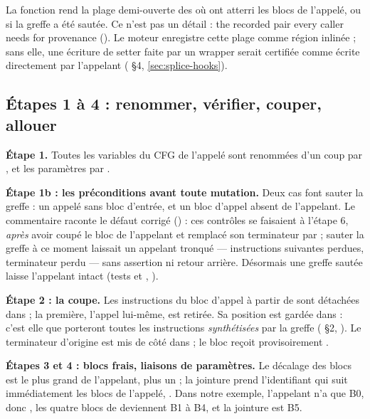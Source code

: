 La fonction rend la plage demi-ouverte des  où ont atterri les blocs de l'appelé, ou  si la greffe a été sautée. Ce n'est pas un détail : \og the recorded pair every caller needs for provenance\fg{} (). Le moteur enregistre cette plage comme région inlinée ; sans elle, une écriture de setter faite par un wrapper serait certifiée comme écrite directement par l'appelant ( §4, \cref{sec:splice-hooks}).

\subsection{Étapes 1 à 4 : renommer, vérifier, couper, allouer}


\textbf{Étape 1.} Toutes les variables du CFG de l'appelé sont renommées d'un coup par , et les paramètres par .

\textbf{Étape 1b : les préconditions avant toute mutation.} Deux cas font sauter la greffe : un appelé sans bloc d'entrée, et un bloc d'appel absent de l'appelant. Le commentaire raconte le défaut corrigé () : ces contrôles se faisaient à l'étape 6, \emph{après} avoir coupé le bloc de l'appelant et remplacé son terminateur par  ; sauter la greffe à ce moment laissait un appelant tronqué --- instructions suivantes perdues, terminateur perdu --- sans assertion ni retour arrière. Désormais une greffe sautée laisse l'appelant intact (tests  et , ).

\textbf{Étape 2 : la coupe.} Les instructions du bloc d'appel à partir de  sont détachées dans  ; la première, l'appel lui-même, est retirée. Sa position est gardée dans  : c'est elle que porteront toutes les instructions \emph{synthétisées} par la greffe ( §2, ). Le terminateur d'origine est mis de côté dans  ; le bloc reçoit provisoirement .

\textbf{Étapes 3 et 4 : blocs frais, liaisons de paramètres.} Le décalage des blocs est \og le plus grand  de l'appelant, plus un\fg{} ; la jointure prend l'identifiant qui suit immédiatement les blocs de l'appelé, . Dans notre exemple, l'appelant n'a que B0, donc , les quatre blocs de  deviennent B1 à B4, et la jointure est B5.

